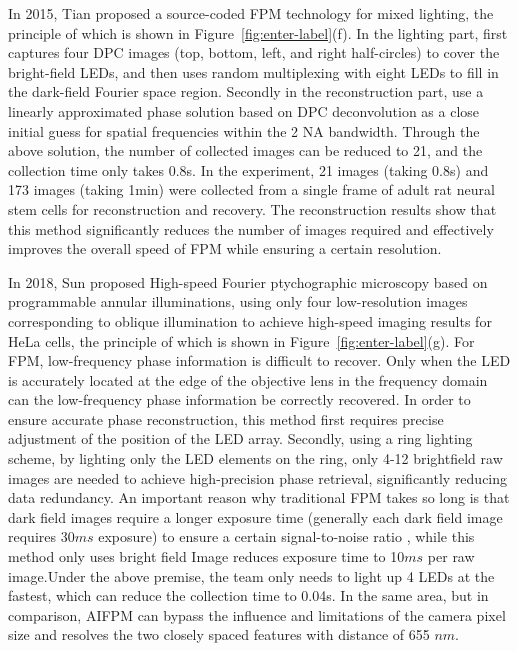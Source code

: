 \documentclass[journal,review,submit,pdftex,moreauthors]{Definitions/mdpi}
\begin{document}
In 2015, Tian proposed a source-coded FPM technology for mixed lighting, the principle of which is shown in Figure~\ref{fig:enter-label}(f). In the lighting part, first captures four DPC images (top, bottom, left, and right half-circles) to cover the bright-field LEDs, and then uses random multiplexing with eight LEDs to fill in the dark-field Fourier space region. Secondly in the reconstruction part, use a linearly approximated phase solution based on DPC deconvolution as a close initial guess for spatial frequencies within the 2 NA bandwidth\cite{tian2015computational}. Through the above solution, the number of collected images can be reduced to 21, and the collection time only takes 0.8s. In the experiment, 21 images (taking 0.8s) and 173 images (taking 1min) were collected from a single frame of adult rat neural stem cells for reconstruction and recovery. The reconstruction results show that this method significantly reduces the number of images required and effectively improves the overall speed of FPM while ensuring a certain resolution.


In 2018, Sun proposed High-speed Fourier ptychographic microscopy based on programmable annular illuminations, using only four low-resolution images corresponding to oblique illumination to achieve high-speed imaging results for HeLa cells, the principle of which is shown in Figure~\ref{fig:enter-label}(g). For FPM, low-frequency phase information is difficult to recover. Only when the LED is accurately located at the edge of the objective lens in the frequency domain can the low-frequency phase information be correctly recovered. In order to ensure accurate phase reconstruction, this method first requires precise adjustment of the position of the LED array. Secondly, using a ring lighting scheme, by lighting only the LED elements on the ring, only 4-12 brightfield raw images are needed to achieve high-precision phase retrieval, significantly reducing data redundancy. An important reason why traditional FPM takes so long is that dark field images require a longer exposure time (generally each dark field image requires 30$ms$ exposure) to ensure a certain signal-to-noise ratio \cite{sun2018high}, while this method only uses bright field Image reduces exposure time to 10$ms$ per raw image.Under the above premise, the team only needs to light up 4 LEDs at the fastest, which can reduce the collection time to 0.04s. In the same area, but in comparison, AIFPM can bypass the influence and limitations of the camera pixel size and resolves the two closely spaced features with distance of 655 $nm$.
\end{document}

